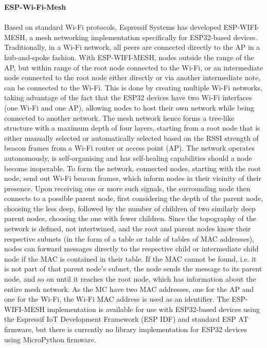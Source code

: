 \textbf{ESP-Wi-Fi-Mesh}\\\\
Based on standard Wi-Fi protocols, Espressif Systems has developed ESP-WIFI-MESH, a mesh networking implementation specifically for ESP32-based devices. Traditionally, in a Wi-Fi network, all peers are connected directly to the AP in a hub-and-spoke fashion. With ESP-WIFI-MESH, nodes outside the range of the AP, but within range of the root node connected to the Wi-Fi, or an intermediate node connected to the root node either directly or via another intermediate note, can be connected to the Wi-Fi. This is done by creating multiple Wi-Fi networks, taking advantage of the fact that the ESP32 devices have two Wi-Fi interfaces (one Wi-Fi and one AP), allowing nodes to host their own network while being connected to another network. The mesh network hence forms a tree-like structure with a maximum depth of four layers, starting from a root node that is either manually selected or automatically selected based on the RSSI strength of beacon frames from a Wi-Fi router or access point (AP). The network operates autonomously, is self-organising and has self-healing capabilities should a node become inoperable. To form the network, connected nodes, starting with the root node, send out Wi-Fi beacon frames, which inform nodes in their vicinity of their presence. Upon receiving one or more such signals, the surrounding node then connects to a possible parent node, first considering the depth of the parent node, choosing the less deep, followed by the number of children of two similarly deep parent nodes, choosing the one with fewer children. Since the topography of the network is defined, not intertwined, and the root and parent nodes know their respective subnets (in the form of a table or table of tables of MAC addresses), nodes can forward messages directly to the respective child or intermediate child node if the MAC is contained in their table. If the MAC cannot be found, i.e. it is not part of that parent node's subnet, the node sends the message to its parent node, and so on until it reaches the root node, which has information about the entire mesh network. As the MC have two MAC addresses, one for the AP and one for the Wi-Fi, the Wi-Fi MAC address is used as an identifier.
The ESP-WIFI-MESH implementation is available for use with ESP32-based devices using the Espressif IoT Development Framework (ESP IDF) and standard ESP AT firmware, but there is currently no library implementation for ESP32 devices using MicroPython firmware. \citep{espressif_systems_esp-wifi-mesh_nodate}\\

